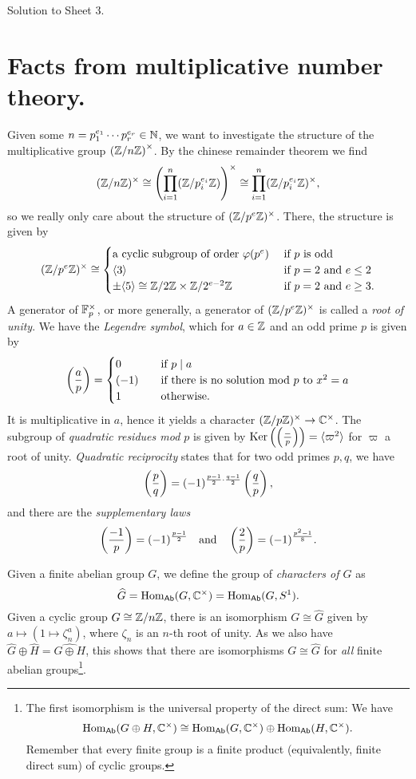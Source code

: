 \documentclass[a4paper,11pt]{article}
\begin{document}
\begin{center}
    \huge{ Solution to Sheet 3. }
\end{center}

\section*{Facts from multiplicative number theory.} Given some $n = p_1^{e_1} \cdots
p_r^{e_r} \in \mathbb{N}$, we want to investigate the structure of the multiplicative group
$\left ( \mathbb{Z}/n\mathbb{Z} \right )^\times$. By the chinese remainder theorem we find 
\[
    (\mathbb{Z} / n\mathbb{Z})^\times \cong \left ( \prod_{i = 1}^n (\mathbb{Z} / p_i^{e_i}\mathbb{Z}) \right
        )^\times \cong \prod_{i = 1}^n (\mathbb{Z} / p_i^{e_i}\mathbb{Z})^\times,
\]
so we really only care about the structure of $(\mathbb{Z}/p^e\mathbb{Z})^\times$. There, the 
structure is given by
\[
    (\mathbb{Z}/p^e\mathbb{Z})^\times \cong 
    \begin{cases} 
        \text{a cyclic subgroup of order $\varphi(p^e)$} & \text{ if $p$ is odd} \\
        \langle 3 \rangle & \text{ if $p=2$ and $e \leq 2$} \\
        \pm \langle 5 \rangle \cong \mathbb{Z}/2\mathbb{Z} \times \mathbb{Z}/2^{e-2}\mathbb{Z} & \text{ if
        $p=2$ and $e \geq 3$.} 
    \end{cases}
\]
A generator of $\mathbb{F}_p^\times$, or more generally, a generator of $(\mathbb{Z}/p^e\mathbb{Z})^\times$
is called a \textit{root of unity}.
We have the \textit{Legendre symbol}, which for $a \in \mathbb{Z}$ and an odd prime $p$
is given by 
\[
    \left( \frac{a}{p} \right) = 
    \begin{cases}
        0 \quad & \text{if } p \mid a\\
        (-1) \quad & \text{if there is no solution mod $p$ to }  x^2 = a\\
        1 \quad & \text{otherwise.}\\
    \end{cases}
\]
It is multiplicative in $a$, hence it yields a character $(\mathbb{Z}/p\mathbb{Z})^\times \to
\mathbb{C}^\times$. The subgroup of \textit{quadratic residues mod $p$} is given by
$\operatorname{Ker} \left( \left( \frac{-}{p} \right) \right) = \langle \varpi^2 \rangle$ for $\varpi$ a
root of unity. \textit{Quadratic reciprocity} states that for two odd primes
$p,q$, we have
\[
    \left( \frac{p}{q} \right) = (-1)^{\frac{p-1}2 \cdot \frac{q-1}2} \left( \frac{q}{p} \right),
\]
and there are the \textit{supplementary laws}
\[
    \left( \frac{-1}{p} \right) = (-1)^{\frac {p-1}2} \quad \text{and} \quad
    \left( \frac{2}{p} \right) = (-1)^{\frac{p^2-1}8}.
\]

Given a finite abelian group $G$, we define the group of \textit{characters of $G$}
as 
\[
    \widehat G = \operatorname{Hom}_{\textnormal{$\textsf{Ab}$}}(G, \mathbb{C}^\times) = \operatorname{Hom}_{\textnormal{$\textsf{Ab}$}}(G, S^1).
\]
Given a cyclic group $G \cong \mathbb{Z}/n\mathbb{Z}$, there is an isomorphism $G \cong
\widehat G$ given by $a \mapsto (1 \mapsto \zeta_n^a)$, where $\zeta_n$ is an
$n$-th root of unity. As we also have $\widehat G \oplus \widehat H =
\widehat{G \oplus H}$, this shows that there are isomorphisms $G \cong \widehat
G$ for \textit{all} finite abelian groups\footnote{The first isomorphism is the
universal property of the direct sum: We have $$\operatorname{Hom}_{\textnormal{$\textsf{Ab}$}}(G \oplus H, \mathbb{C}^\times)
\cong \operatorname{Hom}_{\textnormal{$\textsf{Ab}$}}(G,\mathbb{C}^\times) \oplus \operatorname{Hom}_{\textnormal{$\textsf{Ab}$}}(H,\mathbb{C}^\times).$$ Remember that every
finite group is a finite product (equivalently, finite direct sum) of cyclic
groups.}.
\end{document}
